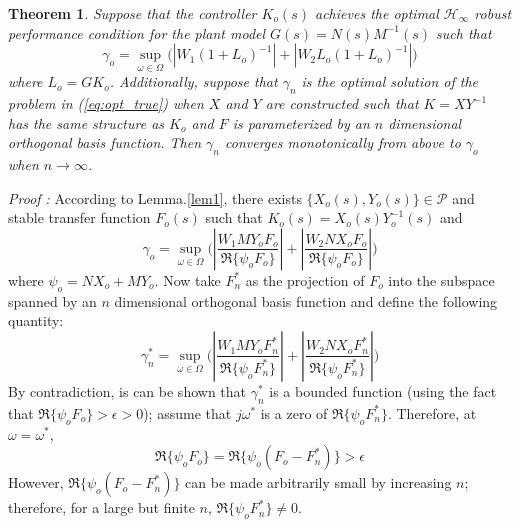 \documentclass[letterpaper, 10 pt, conference]{ieeeconf}  %
\newtheorem{theorem}{Theorem}
\begin{document}
\begin{theorem} \label{thm_1}
Suppose that the controller $K_o(s)$ achieves the optimal $\mathcal{H}_\infty$ robust performance condition for the plant model $G(s) = N(s)M^{-1}(s)$ such that
\begin{equation}
\gamma_o = \sup_{\omega \in \Omega} \bigg(  \left|W_1(1+L_o)^{-1}\right|  + \left|W_2L_o(1+L_o)^{-1}\right|  \bigg)
\end{equation}
where $L_o = GK_o$. Additionally, suppose that $\gamma_n$ is the optimal solution of the problem in (\ref{eq:opt_true}) when $X$ and $Y$ are constructed such that $K = XY^{-1}$ has the same structure as $K_o$ and $F$ is parameterized by an $n$ dimensional orthogonal basis function. Then $\gamma_n$ converges monotonically from above to $\gamma_o$ when $n \rightarrow \infty$.
\end{theorem}
{\it Proof :} 
According to Lemma.\ref{lem1}, there exists $\{X_o(s),Y_o(s)\} \in \mathscr{P}$ and stable transfer function $F_o(s)$ such that $K_o(s) = X_o(s)Y_o^{-1}(s)$ and
\begin{equation}\label{eq:the_eq_1}
\gamma_o = \sup_{\omega \in \Omega} \bigg(  \left|\frac{W_1MY_oF_o}{\Re \{ \psi_oF_o\}} \right| +\left|\frac{W_2NX_oF_o}{\Re \{ \psi_oF_o\}} \right| \bigg)
\end{equation}
where $\psi_o = NX_o+MY_o$. Now take $F_n^*$ as the projection of $F_o$ into the subspace spanned by an $n$ dimensional orthogonal basis function and define the following quantity:
\begin{equation} \label{eq:the_eq_2}
\gamma_n^* = \sup_{\omega \in \Omega} \bigg(  \left|\frac{W_1MY_oF_n^*}{\Re \{ \psi_oF_n^*\}} \right| +\left|\frac{W_2NX_oF_n^*}{\Re \{ \psi_oF_n^*\}} \right| \bigg)
\end{equation}
By contradiction, is can be shown that $\gamma_n^*$ is a bounded function (using the fact that $\Re \{ \psi_oF_o\} > \epsilon > 0$); assume that $j\omega^*$ is a zero of $\Re \{ \psi_o F_n^*\}$. Therefore, at $\omega=\omega^*$,
\begin{equation}
\Re \{ \psi_oF_o\}  = \Re \{ \psi_o(F_o-F_n^*)\} > \epsilon
\end{equation}
However, $\Re \{ \psi_o(F_o-F_n^*)\}$ can be made arbitrarily small by increasing $n$; therefore, for a large but finite $n$, $\Re \{ \psi_o F_n^*\} \neq 0$.
\end{document}
